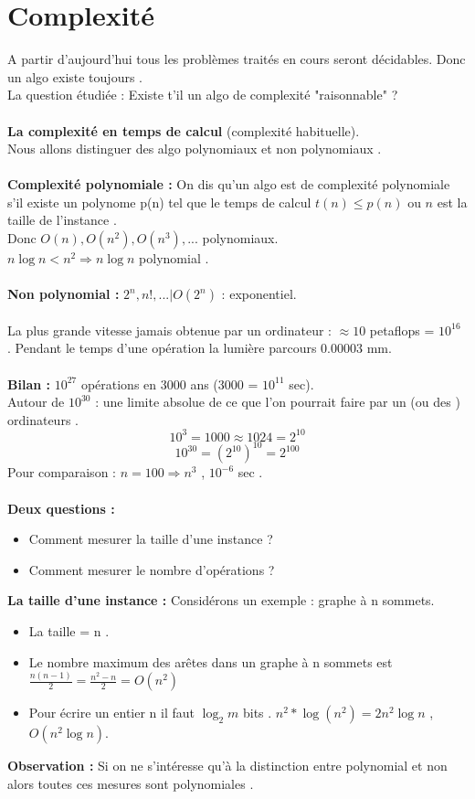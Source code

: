 \documentclass[base.tex]{subfiles}
\begin{document}
\section{Complexité}
A partir d'aujourd'hui tous les problèmes traités en cours seront décidables. Donc un algo existe toujours .\\
La question étudiée : Existe t'il un algo de complexité "raisonnable"  ?\\
\\
\textbf{La complexité en temps de calcul} (complexité habituelle).\\
  Nous allons distinguer des algo polynomiaux et non polynomiaux .\\
  \\
  \textbf{Complexité polynomiale :} On dis qu'un algo est de complexité polynomiale s'il existe un polynome p(n) tel que le temps de calcul $t(n)\leq p(n)$ ou $n$ est la taille de l'instance .\\
  Donc $O(n),O(n^2),O(n^3),...$ polynomiaux.\\
  $n\log n <  n^2 \Rightarrow n \log n $ polynomial .\\
  \\
  \textbf{Non polynomial :} $2^n,n!,...| O(2^n)$ : exponentiel.\\
  \\
  La plus grande vitesse jamais obtenue par un ordinateur : $\approx 10$ petaflops = $10^{16}$ . Pendant le temps d'une opération la lumière parcours 0.00003 mm.\\
  \\
  \textbf{Bilan : }$10^{27}$ opérations en 3000 ans (3000 = $10^{11}$ sec).\\
  Autour de $10^{30}$ : une limite absolue de ce que l'on pourrait faire par un (ou des ) ordinateurs . \\
  \[10^3 = 1000 \approx 1024 = 2^{10}\]
  \[10^{30} = (2^{10})^{10} = 2^{100}\]
  Pour comparaison : $n = 100 \Rightarrow n^3$ , $10^{-6}$ sec .\\
  \\
  \textbf{Deux questions :}
  \begin{itemize}
  \item Comment mesurer la taille d'une instance ?
    \item Comment mesurer le nombre d'opérations ?
  \end{itemize}
  \textbf{La taille d'une instance : } Considérons un exemple : graphe à n sommets.
  \begin{itemize}
  \item La taille = n .
  \item Le nombre maximum des arêtes dans un graphe à n sommets est $\frac{n(n-1)}{2} = \frac{n^2-n}{2} = O(n^2)$
    \item Pour écrire un entier n il faut $\log_2m$ bits . $n^2 * \log(n^2) = 2n^2\log n$ , $O(n^2\log n)$.
  \end{itemize}
  \textbf{Observation : } Si on ne s'intéresse qu'à la distinction entre polynomial et non alors toutes ces mesures sont polynomiales .
\end{document}
